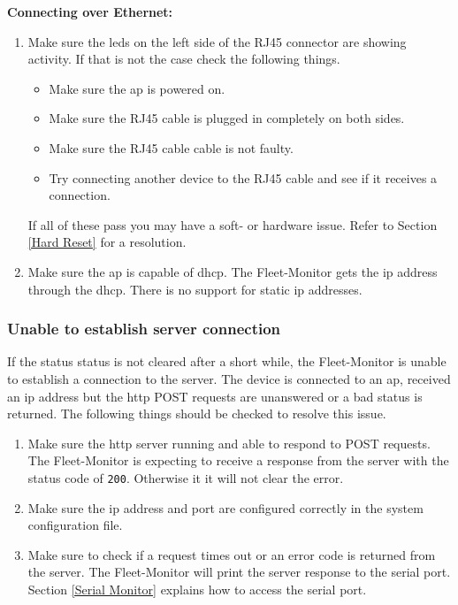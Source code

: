 \textbf{Connecting over Ethernet:}
\begin{enumerate}
  \item Make sure the \acrshort{led}s on the left side of the RJ45 connector are showing activity. If that is not the case check the following things.
  \begin{itemize}
      \item Make sure the \acrlong{ap} is powered on.
      \item Make sure the RJ45 cable is plugged in completely on both sides.
      \item Make sure the RJ45 cable cable is not faulty.
      \item Try connecting another device to the RJ45 cable and see if it receives a connection.
  \end{itemize}
  If all of these pass you may have a soft- or hardware issue. Refer to Section \ref{Hard Reset} for a resolution.
  \item Make sure the \acrlong{ap} is capable of \acrshort{dhcp}. The Fleet-Monitor gets the \acrshort{ip} address through the \acrlong{dhcp}. There is no support for static \acrshort{ip} addresses.
\end{enumerate}
\newpage

\subsubsection{Unable to establish server connection}\label{Unable to establish server connection}
If the status status is not cleared after a short while, the Fleet-Monitor is unable to establish a connection to the server. The device is connected to an \acrshort{ap}, received an \acrshort{ip} address but the \acrshort{http} POST requests are unanswered or a bad status is returned. The following things should be checked to resolve this issue.

\begin{enumerate}
  \item Make sure the \acrshort{http} server running and able to respond to POST requests. The Fleet-Monitor is expecting to receive a response from the server with the status code of \texttt{200}. Otherwise it it will not clear the error.
  \item Make sure the \acrshort{ip} address and port are configured correctly in the system configuration file.
  \item Make sure to check if a request times out or an error code is returned from the server. The Fleet-Monitor will print the server response to the serial port. Section \ref{Serial Monitor} explains how to access the serial port.
\end{enumerate}

